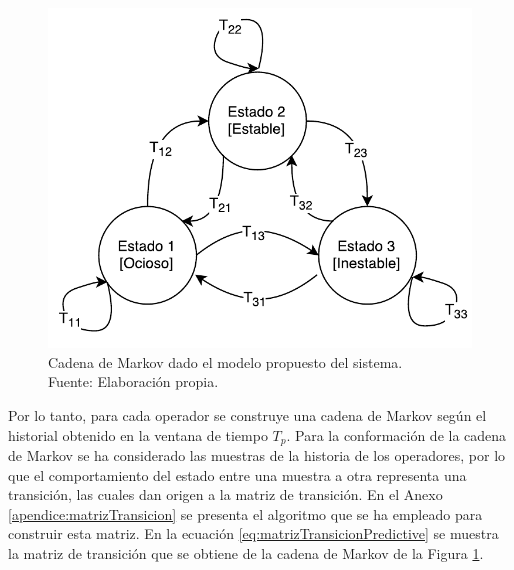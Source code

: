 \begin{figure}[ht!]
  \centering
  \captionsetup{justification=centering}
    \includegraphics[scale=0.75]{images/CadenaMarkovPredictiva.pdf}
  \caption[Cadena de Markov dado el modelo propuesto del sistema.]{Cadena de Markov dado el modelo propuesto del sistema.\\Fuente: Elaboración propia.}
  \label{fig:cadenaMarkovPredictiva}
\end{figure}


Por lo tanto, para cada operador se construye una cadena de Markov seg\'un el historial obtenido en la ventana de tiempo $T_p$. Para la conformaci\'on de la cadena de Markov se ha considerado las muestras de la historia de los operadores, por lo que el comportamiento del estado entre una muestra a otra representa una transici\'on, las cuales dan origen a la matriz de transici\'on. En el Anexo \ref{apendice:matrizTransicion} se presenta el algoritmo que se ha empleado para construir esta matriz. En la ecuaci\'on \ref{eq:matrizTransicionPredictive} se muestra la matriz de transici\'on que se obtiene de la cadena de Markov de la Figura \ref{fig:cadenaMarkovPredictiva}.

